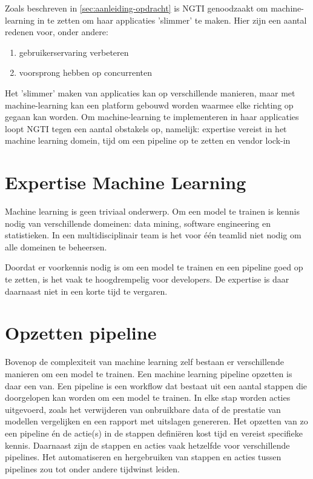 
Zoals beschreven in \autoref{sec:aanleiding-opdracht} is NGTI genoodzaakt om machine-learning in te zetten om haar applicaties 'slimmer' te maken. Hier zijn een aantal redenen voor, onder andere:
\begin{enumerate}
  \item gebruikerservaring verbeteren
  \item voorsprong hebben op concurrenten
\end{enumerate}

Het 'slimmer' maken van applicaties kan op verschillende manieren, maar met machine-learning kan een platform gebouwd worden waarmee elke richting op gegaan kan worden. Om machine-learning te implementeren in haar applicaties loopt NGTI tegen een aantal obstakels op, namelijk: expertise vereist in het machine learning domein, tijd om een pipeline op te zetten en vendor lock-in

\section{Expertise Machine Learning}\label{sec:expertise-machine-learning}
Machine learning is geen triviaal onderwerp. Om een model te trainen is kennis nodig van verschillende domeinen: data mining, software engineering en statistieken. In een multidisciplinair team is het voor één teamlid niet nodig om alle domeinen te beheersen.

Doordat er voorkennis nodig is om een model te trainen en een pipeline goed op te zetten, is het vaak te hoogdrempelig voor developers. De expertise is daar daarnaast niet in een korte tijd te vergaren.

\section{Opzetten pipeline}\label{sec:opzetten-pipeline}
Bovenop de complexiteit van machine learning zelf bestaan er verschillende manieren om een model te trainen. Een machine learning pipeline opzetten is daar een van. Een pipeline is een workflow dat bestaat uit een aantal stappen die doorgelopen kan worden om een model te trainen. In elke stap worden acties uitgevoerd, zoals het verwijderen van onbruikbare data of de prestatie van modellen vergelijken en een rapport met uitslagen genereren. Het opzetten van zo een pipeline én de actie(s) in de stappen definiëren kost tijd en vereist specifieke kennis. Daarnaast zijn de stappen en acties vaak hetzelfde voor verschillende pipelines. Het automatiseren en hergebruiken van stappen en acties tussen pipelines zou tot onder andere tijdwinst leiden.

